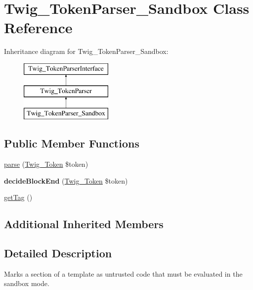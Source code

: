 \hypertarget{classTwig__TokenParser__Sandbox}{}\section{Twig\+\_\+\+Token\+Parser\+\_\+\+Sandbox Class Reference}
\label{classTwig__TokenParser__Sandbox}
Inheritance diagram for Twig\+\_\+\+Token\+Parser\+\_\+\+Sandbox\+:\begin{figure}[H]
\begin{center}
\leavevmode
\includegraphics[height=3.000000cm]{classTwig__TokenParser__Sandbox}
\end{center}
\end{figure}
\subsection*{Public Member Functions}
\begin{DoxyCompactItemize}
\item 
\hyperlink{classTwig__TokenParser__Sandbox_ae6922a6cb9072b812ca32903760b11a5}{parse} (\hyperlink{classTwig__Token}{Twig\+\_\+\+Token} \$token)
\item 
{\bfseries decide\+Block\+End} (\hyperlink{classTwig__Token}{Twig\+\_\+\+Token} \$token)\hypertarget{classTwig__TokenParser__Sandbox_a0e587afd8bedbab02e225b21b6276e67}{}\label{classTwig__TokenParser__Sandbox_a0e587afd8bedbab02e225b21b6276e67}

\item 
\hyperlink{classTwig__TokenParser__Sandbox_ae518af703eb8417601e673ae0138b7eb}{get\+Tag} ()
\end{DoxyCompactItemize}
\subsection*{Additional Inherited Members}


\subsection{Detailed Description}
Marks a section of a template as untrusted code that must be evaluated in the sandbox mode.


